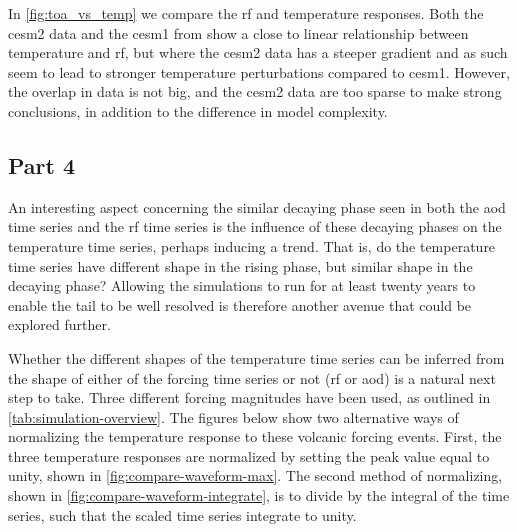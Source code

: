 \documentclass{ametsocV5}
\begin{document}

In \cref{fig:toa_vs_temp} we compare the \ac{rf} and temperature responses. Both the
\ac{cesm2} data and the \ac{cesm1} from \citet{ottobliesner2016} show a close to linear
relationship between temperature and \ac{rf}, but where the \ac{cesm2} data has a
steeper gradient and as such seem to lead to stronger temperature perturbations compared
to \ac{cesm1}. However, the overlap in data is not big, and the \ac{cesm2} data are too
sparse to make strong conclusions, in addition to the difference in model complexity.


\subsection{Part 4}

An interesting aspect concerning the similar decaying phase seen in both the \ac{aod}
time series and the \ac{rf} time series is the influence of these decaying phases on the
temperature time series, perhaps inducing a trend. That is, do the temperature time
series have different shape in the rising phase, but similar shape in the decaying
phase? Allowing the simulations to run for at least twenty years to enable the tail to
be well resolved is therefore another avenue that could be explored further.

Whether the different shapes of the temperature time series can be inferred from the
shape of either of the forcing time series or not (\ac{rf} or \ac{aod}) is a natural
next step to take. Three different forcing magnitudes have been used, as outlined in
\cref{tab:simulation-overview}. The figures below show two alternative ways of
normalizing the temperature response to these volcanic forcing events. First, the three
temperature responses are normalized by setting the peak value equal to unity, shown in
\cref{fig:compare-waveform-max}. The second method of normalizing, shown in
\cref{fig:compare-waveform-integrate}, is to divide by the integral of the time series,
such that the scaled time series integrate to unity.
\end{document}
